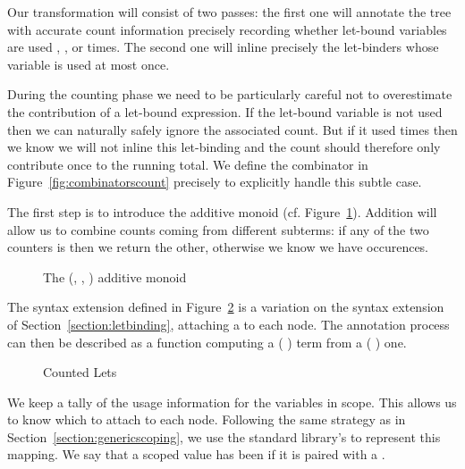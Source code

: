Our transformation will consist of two passes: the first one will annotate
the tree with accurate count information precisely recording whether
let-bound variables are used , , or  times.
The second one will inline precisely the let-binders whose variable is
used at most once.

During the counting phase we need to be particularly careful not to overestimate
the contribution of a let-bound expression. If the let-bound variable is not used
then we can naturally safely ignore the associated count. But if it used 
times then we know we will not inline this let-binding and the count should
therefore only contribute once to the running total. We define the 
combinator in Figure~\ref{fig:combinatorscount} precisely to explicitly handle this
subtle case.

The first step is to introduce the  additive monoid
(cf. Figure~\ref{fig:countermonoid}). Addition will
allow us to combine counts coming from different subterms: if any of the two
counters is  then we return the other, otherwise we know we have
 occurences.

\begin{figure}[h]
\begin{minipage}{0.45\textwidth}
\end{minipage}
\begin{minipage}{0.45\textwidth}
\end{minipage}
\caption{The (, , \AF{\_+\_}) additive monoid}
\label{fig:countermonoid}
\end{figure}

The syntax extension  defined in Figure~\ref{fig:cletdef} is
a variation on the  syntax extension of Section~\ref{section:letbinding},
attaching a  to each  node. The annotation process
can then be described as a function computing a
{(  )} term from a {(  )} one.

\begin{figure}[h]
  \caption{Counted Lets}
  \label{fig:cletdef}
\end{figure}

We keep a tally of the usage information for the variables in scope. This
allows us to know which  to attach to each  node.
Following the same strategy as in Section~\ref{section:genericscoping},
we use the standard library's  to represent this mapping. We say
that a scoped value has been  if it is paired with a .

